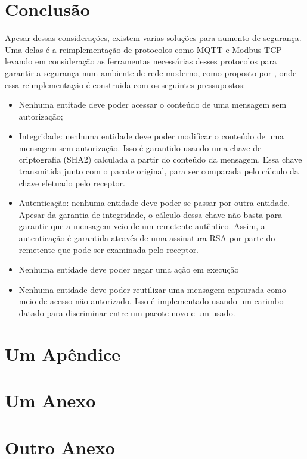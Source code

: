 \documentclass[tcc,capa]{texufpel}
\begin{document}
\chapter{Conclusão}
Apesar dessas considerações, existem varias soluções para aumento de segurança. Uma delas é a reimplementação de protocolos como MQTT e Modbus TCP levando em consideração as
ferramentas necessárias desses protocolos para garantir a segurança num ambiente de rede moderno, como proposto por \citet{fovino2009design}, onde essa reimplementação é construida
com os seguintes pressupostos:

\begin{itemize}
        \item Nenhuma entitade deve poder acessar o conteúdo de uma mensagem sem autorização;
        \item Integridade: nenhuma entidade deve poder modificar o conteúdo de uma mensagem sem autorização. Isso é garantido usando uma chave de criptografia (SHA2) calculada a
                partir do conteúdo da mensagem. Essa chave transmitida junto com o pacote original, para ser comparada pelo cálculo da chave efetuado pelo receptor.
        \item Autenticação: nenhuma entidade deve poder se passar por outra entidade. Apesar da garantia de integridade, o cálculo dessa chave não basta para garantir que a
                mensagem veio de um remetente autêntico. Assim, a autenticação é garantida através de uma assinatura RSA por parte do remetente que pode ser examinada pelo
                receptor.
        \item Nenhuma entidade deve poder negar uma ação em execução
        \item Nenhuma entidade deve poder reutilizar uma mensagem capturada como meio de acesso não autorizado. Isso é implementado usando um carimbo datado para discriminar entre
                um pacote novo e um usado.
\end{itemize}



 

\apendices
\chapter{Um Apêndice}

\anexos
\chapter{Um Anexo}


\chapter{Outro Anexo}
\end{document}
